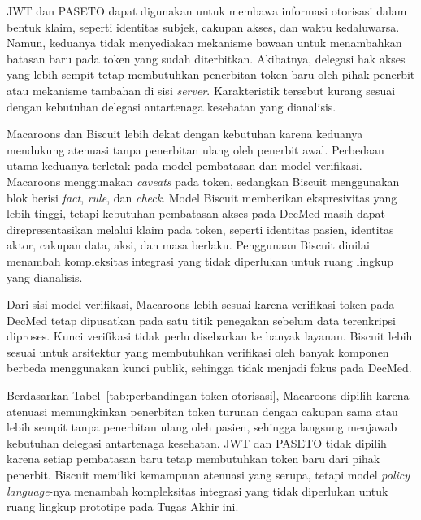 JWT dan PASETO dapat digunakan untuk membawa informasi otorisasi dalam bentuk klaim, seperti identitas subjek, cakupan akses, dan waktu kedaluwarsa. Namun, keduanya tidak menyediakan mekanisme bawaan untuk menambahkan batasan baru pada token yang sudah diterbitkan. Akibatnya, delegasi hak akses yang lebih sempit tetap membutuhkan penerbitan token baru oleh pihak penerbit atau mekanisme tambahan di sisi \textit{server}. Karakteristik tersebut kurang sesuai dengan kebutuhan delegasi antartenaga kesehatan yang dianalisis.

Macaroons dan Biscuit lebih dekat dengan kebutuhan karena keduanya mendukung atenuasi tanpa penerbitan ulang oleh penerbit awal. Perbedaan utama keduanya terletak pada model pembatasan dan model verifikasi. Macaroons menggunakan \textit{caveats} pada token, sedangkan Biscuit menggunakan blok berisi \textit{fact}, \textit{rule}, dan \textit{check}. Model Biscuit memberikan ekspresivitas yang lebih tinggi, tetapi kebutuhan pembatasan akses pada DecMed masih dapat direpresentasikan melalui klaim pada token, seperti identitas pasien, identitas aktor, cakupan data, aksi, dan masa berlaku. Penggunaan Biscuit dinilai menambah kompleksitas integrasi yang tidak diperlukan untuk ruang lingkup yang dianalisis.

Dari sisi model verifikasi, Macaroons lebih sesuai karena verifikasi token pada DecMed tetap dipusatkan pada satu titik penegakan sebelum data terenkripsi diproses. Kunci verifikasi tidak perlu disebarkan ke banyak layanan. Biscuit lebih sesuai untuk arsitektur yang membutuhkan verifikasi oleh banyak komponen berbeda menggunakan kunci publik, sehingga tidak menjadi fokus pada DecMed.

Berdasarkan Tabel~\ref{tab:perbandingan-token-otorisasi}, Macaroons dipilih karena atenuasi memungkinkan penerbitan token turunan dengan cakupan sama atau lebih sempit tanpa penerbitan ulang oleh pasien, sehingga langsung menjawab kebutuhan delegasi antartenaga kesehatan. JWT dan PASETO tidak dipilih karena setiap pembatasan baru tetap membutuhkan token baru dari pihak penerbit. Biscuit memiliki kemampuan atenuasi yang serupa, tetapi model \textit{policy language}-nya menambah kompleksitas integrasi yang tidak diperlukan untuk ruang lingkup prototipe pada Tugas Akhir ini.